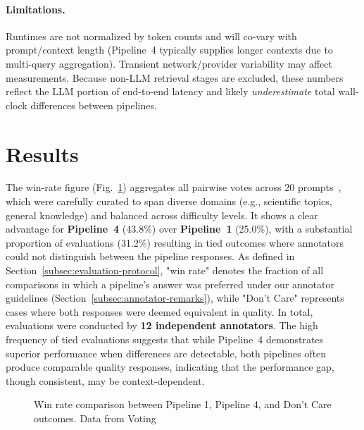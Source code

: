 \documentclass[manuscript,screen]{acmart}
\begin{document}
\begin{CCSXML}
	
	\paragraph{Limitations.}
	Runtimes are not normalized by token counts and will co-vary with prompt/context length
	(Pipeline~4 typically supplies longer contexts due to multi-query aggregation). Transient
	network/provider variability may affect measurements. Because non-LLM retrieval stages are
	excluded, these numbers reflect the LLM portion of end-to-end latency and likely
	\emph{underestimate} total wall-clock differences between pipelines.

	
\section{Results}
\label{sec:results}
	
The win-rate figure (Fig.~\ref{fig:winrate-overall}) aggregates all pairwise votes across 20 prompts~\cite{eval}, which were carefully curated to span diverse domains (e.g., scientific topics, general knowledge) and balanced across difficulty levels. It shows a clear advantage for \textbf{Pipeline~4} (43.8\%) over \textbf{Pipeline~1} (25.0\%), with a substantial proportion of evaluations (31.2\%) resulting in tied outcomes where annotators could not distinguish between the pipeline responses. As defined in Section~\ref{subsec:evaluation-protocol}, "win rate" denotes the fraction of all comparisons in which a pipeline's answer was preferred under our annotator guidelines (Section~\ref{subsec:annotator-remarks}), while "Don't Care" represents cases where both responses were deemed equivalent in quality. In total, evaluations were conducted by \textbf{12 independent annotators}. The high frequency of tied evaluations suggests that while Pipeline~4 demonstrates superior performance when differences are detectable, both pipelines often produce comparable quality responses, indicating that the performance gap, though consistent, may be context-dependent.

\begin{figure}[H]
\centering
{}
\caption{Win rate comparison between Pipeline 1, Pipeline 4, and Don't Care outcomes. Data from Voting \cite{eval}}
\label{fig:winrate-overall}
\end{figure}


\end{CCSXML}
\end{document}
